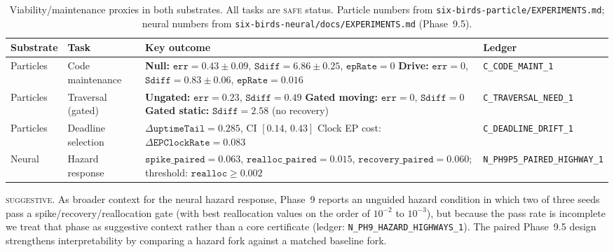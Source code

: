 \documentclass[11pt]{article}
\newcommand{\SAFE}{\textsc{safe}}
\newcommand{\SUGG}{\textsc{suggestive}}
\begin{document}
\begin{table}[t]
\centering
\small
\begin{tabularx}{\textwidth}{@{}l l X l@{}}
\toprule
Substrate & Task & Key outcome & Ledger \\
\midrule
Particles & Code maintenance &
\textbf{Null:} $\texttt{err}=0.43{\pm}0.09$, $\texttt{Sdiff}=6.86{\pm}0.25$, $\texttt{epRate}=0$ \newline
\textbf{Drive:} $\texttt{err}=0$, $\texttt{Sdiff}=0.83{\pm}0.06$, $\texttt{epRate}=0.016$
& \texttt{C\_CODE\_MAINT\_1} \\
\addlinespace
Particles & Traversal (gated) &
\textbf{Ungated:} $\texttt{err}=0.23$, $\texttt{Sdiff}=0.49$ \newline
\textbf{Gated moving:} $\texttt{err}=0$, $\texttt{Sdiff}=0$ \newline
\textbf{Gated static:} $\texttt{Sdiff}=2.58$ (no recovery)
& \texttt{C\_TRAVERSAL\_NEED\_1} \\
\addlinespace
Particles & Deadline selection &
$\Delta\texttt{uptimeTail}=0.285$, CI $[0.14,\,0.43]$ \newline
Clock EP cost: $\Delta\texttt{EPClockRate}=0.083$
& \texttt{C\_DEADLINE\_DRIFT\_1} \\
\addlinespace
Neural & Hazard response &
$\texttt{spike\_paired}=0.063$, $\texttt{realloc\_paired}=0.015$, $\texttt{recovery\_paired}=0.060$; threshold: $\texttt{realloc}\ge 0.002$
& \texttt{N\_PH9P5\_PAIRED\_HIGHWAY\_1} \\
\bottomrule
\end{tabularx}
\caption{Viability/maintenance proxies in both substrates. All tasks are \SAFE{} status. Particle numbers from \texttt{six-birds-particle/EXPERIMENTS.md}; neural numbers from \texttt{six-birds-neural/docs/EXPERIMENTS.md} (Phase~9.5).}
\label{tab:viability}
\end{table}

\SUGG. As broader context for the neural hazard response, Phase~9 reports an unguided hazard condition in which two of three seeds pass a spike/recovery/reallocation gate (with best reallocation values on the order of $10^{-2}$ to $10^{-3}$), but because the pass rate is incomplete we treat that phase as suggestive context rather than a core certificate (ledger: \texttt{N\_PH9\_HAZARD\_HIGHWAYS\_1}). The paired Phase~9.5 design strengthens interpretability by comparing a hazard fork against a matched baseline fork.
\end{document}
